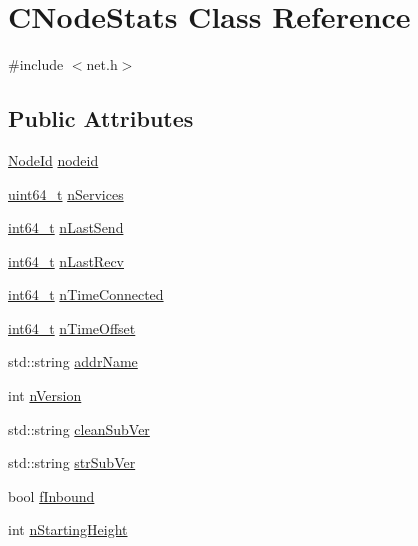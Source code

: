 \hypertarget{class_c_node_stats}{}\section{C\+Node\+Stats Class Reference}
\label{class_c_node_stats}


{\ttfamily \#include $<$net.\+h$>$}

\subsection*{Public Attributes}
\begin{DoxyCompactItemize}
\item 
\hyperlink{net_8h_a954d746a58632565552615fd0a4ee660}{Node\+Id} \hyperlink{class_c_node_stats_ad2bceab1a335d59f42af37178b72fee7}{nodeid}
\item 
\hyperlink{stdint_8h_aaa5d1cd013383c889537491c3cfd9aad}{uint64\+\_\+t} \hyperlink{class_c_node_stats_a3c56fe96daccb9339314953d249dfa15}{n\+Services}
\item 
\hyperlink{stdint_8h_adec1df1b8b51cb32b77e5b86fff46471}{int64\+\_\+t} \hyperlink{class_c_node_stats_adc88b64389f26227db58ed86058d2e1a}{n\+Last\+Send}
\item 
\hyperlink{stdint_8h_adec1df1b8b51cb32b77e5b86fff46471}{int64\+\_\+t} \hyperlink{class_c_node_stats_a67b3cd5817ad20bfb2d9eb1583f1deb5}{n\+Last\+Recv}
\item 
\hyperlink{stdint_8h_adec1df1b8b51cb32b77e5b86fff46471}{int64\+\_\+t} \hyperlink{class_c_node_stats_a3d5133369e51db3c45839c8a68c662d1}{n\+Time\+Connected}
\item 
\hyperlink{stdint_8h_adec1df1b8b51cb32b77e5b86fff46471}{int64\+\_\+t} \hyperlink{class_c_node_stats_a905b33fdcf0443f25fa19ea4d10e8e59}{n\+Time\+Offset}
\item 
std\+::string \hyperlink{class_c_node_stats_a3299ecdae870c367fe657f3f59b27e43}{addr\+Name}
\item 
int \hyperlink{class_c_node_stats_ac8892d29d7c246e34e78fbc15ae77276}{n\+Version}
\item 
std\+::string \hyperlink{class_c_node_stats_ad733b840ac9a16a7eb6166ea4984d8a8}{clean\+Sub\+Ver}
\item 
std\+::string \hyperlink{class_c_node_stats_a9029626f81544ffe6727cf63a091974f}{str\+Sub\+Ver}
\item 
bool \hyperlink{class_c_node_stats_a34627c46cac7bc2bfb3406c954522b49}{f\+Inbound}
\item 
int \hyperlink{class_c_node_stats_a86ff627e31f8ab881a8e11bb3acf4f19}{n\+Starting\+Height}

\end{DoxyCompactItemize}
